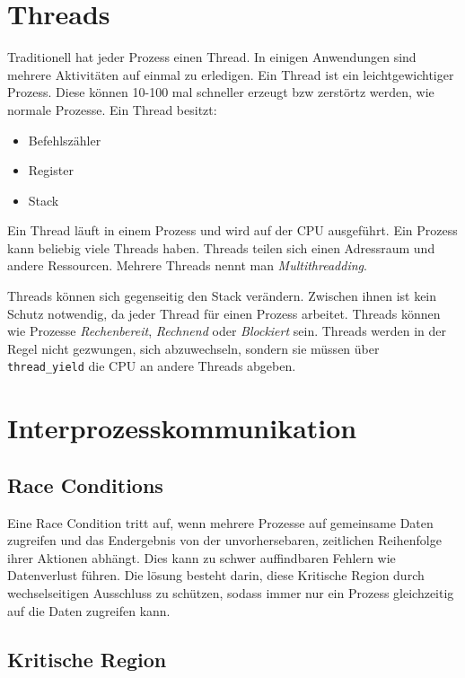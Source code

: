 \section{Threads}

Traditionell hat jeder Prozess einen Thread. In einigen Anwendungen sind
mehrere Aktivitäten auf einmal zu erledigen. Ein Thread ist ein
leichtgewichtiger Prozess. Diese können 10-100 mal schneller erzeugt bzw
zerstörtz werden, wie normale Prozesse. Ein Thread besitzt:

\begin{itemize}
    \item Befehlszähler
    \item Register
    \item Stack
\end{itemize}

Ein Thread läuft in einem Prozess und wird auf der CPU ausgeführt. Ein Prozess
kann beliebig viele Threads haben. Threads teilen sich einen Adressraum und
andere Ressourcen. Mehrere Threads nennt man \textit{Multithreadding}.

Threads können sich gegenseitig den Stack verändern. Zwischen ihnen ist kein
Schutz notwendig, da jeder Thread für einen Prozess arbeitet. Threads können
wie Prozesse \textit{Rechenbereit}, \textit{Rechnend} oder \textit{Blockiert}
sein. Threads werden in der Regel nicht gezwungen, sich abzuwechseln, sondern
sie müssen über \texttt{thread\_yield} die CPU an andere Threads abgeben.

\section{Interprozesskommunikation}

\subsection{Race Conditions}
\label{race_conditions}

Eine Race Condition tritt auf, wenn mehrere Prozesse auf gemeinsame Daten
zugreifen und das Endergebnis von der unvorhersebaren, zeitlichen Reihenfolge
ihrer Aktionen abhängt. Dies kann zu schwer auffindbaren Fehlern wie
Datenverlust führen. Die lösung besteht darin, diese Kritische Region durch
wechselseitigen Ausschluss zu schützen, sodass immer nur ein Prozess
gleichzeitig auf die Daten zugreifen kann.

\subsection{Kritische Region}

